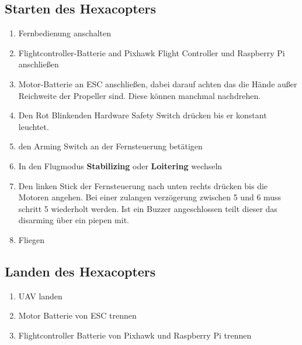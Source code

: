 \documentclass[12pt]{article}
\begin{document}
\subsection{Starten des Hexacopters}

\begin{enumerate}
\item  Fernbedienung anschalten

\item Flightcontroller-Batterie and Pixhawk Flight Controller und Raspberry Pi anschließen
\item Motor-Batterie an ESC anschließen, dabei darauf achten das die Hände außer Reichweite der Propeller sind. Diese können manchmal nachdrehen.
\item Den Rot Blinkenden Hardware Safety Switch drücken bis er konstant leuchtet.

\item den Arming Switch an der Fernsteuerung betätigen

\item  In den Flugmodus \textbf{Stabilizing} oder \textbf{Loitering} wechseln
\item  Den linken Stick der Fernsteuerung nach unten rechts drücken bis die Motoren angehen. Bei einer zulangen verzögerung zwischen 5 und 6 muss schritt 5 wiederholt werden. Ist ein Buzzer angeschlossen teilt dieser das disarming über ein piepen mit.

\item  Fliegen
\end{enumerate}

\subsection{Landen des Hexacopters}

\begin{enumerate}
\item UAV landen
\item Motor Batterie von ESC trennen
\item Flightcontroller Batterie von Pixhawk und Raspberry Pi trennen
\end{enumerate}

\end{document}
